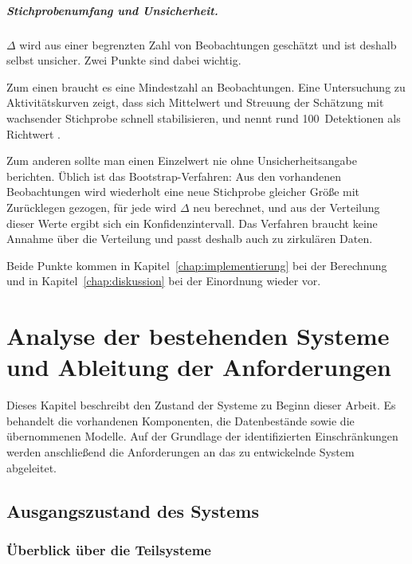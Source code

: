\documentclass[12pt,a4paper]{report}
\begin{document}
\paragraph{Stichprobenumfang und Unsicherheit.}

$\Delta$ wird aus einer begrenzten Zahl von Beobachtungen geschätzt und ist deshalb selbst
unsicher. Zwei Punkte sind dabei wichtig.

Zum einen braucht es eine Mindestzahl an Beobachtungen. Eine Untersuchung zu
Aktivitätskurven zeigt, dass sich Mittelwert und Streuung der Schätzung mit wachsender
Stichprobe schnell stabilisieren, und nennt rund 100~Detektionen als Richtwert
\cite{Cove2018}.

Zum anderen sollte man einen Einzelwert nie ohne Unsicherheitsangabe berichten. Üblich ist
das Bootstrap-Verfahren: Aus den vorhandenen Beobachtungen wird wiederholt eine neue
Stichprobe gleicher Größe mit Zurücklegen gezogen, für jede wird $\Delta$ neu berechnet, und
aus der Verteilung dieser Werte ergibt sich ein Konfidenzintervall. Das Verfahren braucht
keine Annahme über die Verteilung und passt deshalb auch zu zirkulären Daten.

Beide Punkte kommen in Kapitel~\ref{chap:implementierung} bei der Berechnung und in
Kapitel~\ref{chap:diskussion} bei der Einordnung wieder vor.

\chapter{Analyse der bestehenden Systeme und Ableitung der Anforderungen}
\label{chap:analyse}

Dieses Kapitel beschreibt den Zustand der Systeme zu Beginn dieser Arbeit. Es behandelt die vorhandenen Komponenten, die Datenbestände sowie die übernommenen Modelle. Auf der Grundlage der identifizierten Einschränkungen werden anschließend die Anforderungen an das zu entwickelnde System abgeleitet.

\section{Ausgangszustand des Systems}
\label{sec:ausgangszustand}

\subsection{Überblick über die Teilsysteme}
\label{subsec:systemuebersicht}
\end{document}
